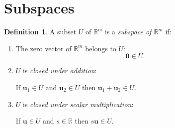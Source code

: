 \documentclass[12pt]{amsart}
\newcommand{\RR}{\mathbb{R}}
\theoremstyle{definition} \newtheorem{definition}[theorem]{Definition}
\newcommand{\bu}{\mathbf{u}}
\newcommand{\bzero}{\mathbf{0}}
\begin{document}
\section{Subspaces}

\begin{definition}\label{df:subspace}
  A subset $U$ of $\RR^m$ is a \emph{subspace of $\RR^m$} if:
  \begin{enumerate}
    \item The zero vector of $\RR^m$ belongs to $U$:
      \[
        \bzero\in U.
      \]
    \item $U$ is \emph{closed under addition}:
      \begin{center}
        If $\bu_1\in U$ and $\bu_2\in U$ then $\bu_1+\bu_2\in U$.
      \end{center}
    \item $U$ is \emph{closed under scalar multiplication}:
      \begin{center}
        If $\bu\in U$ and $s\in \RR$ then $s\bu\in U$.
      \end{center}
  \end{enumerate}
\end{definition}
\end{document}
